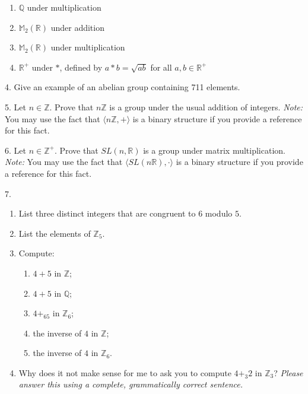 \documentclass[10pt,]{book}
\theoremstyle{plain}
\theoremstyle{definition}
\theoremstyle{definition}
\theoremstyle{definition}
\theoremstyle{definition}
\numberwithin{equation}{section}
\def\Z{\mathbb{Z}}
\def\R{\mathbb{R}}
\def\Q{\mathbb{Q}}
\def\M{\mathbb{M}}
\begin{document}
\begin{exerciselist}
\begin{enumerate}[label=(\alph*)]
\item\hypertarget{li-105}{}\(\Q\) under multiplication%
\item\hypertarget{li-106}{}\(\M_2(\R)\) under addition%
\item\hypertarget{li-107}{}\(\M_2(\R)\) under multiplication%
\item\hypertarget{li-108}{}\(\R^+\) under \(*\), defined by \(a*b=\sqrt{ab}\) for all \(a,b\in \R^+\)%
\end{enumerate}
%
\par\smallskip
\item[4.]\hypertarget{exercise-15}{}Give an example of an abelian group containing 711 elements.%
\par\smallskip
\item[5.]\hypertarget{exercise-16}{}Let \(n\in \Z\). Prove that \(n\Z\) is a group under the usual addition of integers. \emph{Note:} You may use the fact that \(\langle n\Z,+\rangle\) is a binary structure if you provide a reference for this fact.%
\par\smallskip
\item[6.]\hypertarget{exercise-17}{}Let \(n\in \Z^+\). Prove that \(SL(n,\R)\) is a group under matrix multiplication. \emph{Note:} You may use the fact that \(\langle SL(n\R),\cdot\rangle\) is a binary structure if you provide a reference for this fact.%
\par\smallskip
\item[7.]\hypertarget{exercise-18}{}\leavevmode%
\begin{enumerate}[label=(\alph*)]
\item\hypertarget{li-113}{}List three distinct integers that are congruent to \(6\) modulo \(5\).%
\item\hypertarget{li-114}{}List the elements of \(\Z_5\).%
\item\hypertarget{li-115}{}Compute: %
\begin{enumerate}[label=\roman*.]
\item\hypertarget{li-116}{}\(4+5\) in \(\Z\);%
\item\hypertarget{li-117}{}\(4+5\) in \(\Q\);%
\item\hypertarget{li-118}{}\(4+_65\) in \(\Z_6\);%
\item\hypertarget{li-119}{}the inverse of \(4\) in \(\Z\);%
\item\hypertarget{li-120}{}the inverse of \(4\) in \(\Z_6\).%
\end{enumerate}
%
\item\hypertarget{li-121}{}Why does it not make sense for me to ask you to compute \(4+_3 2\) in \(\Z_3\)? \emph{Please answer this using a complete, grammatically correct sentence.}%

\end{enumerate}
\end{exerciselist}
\end{document}
